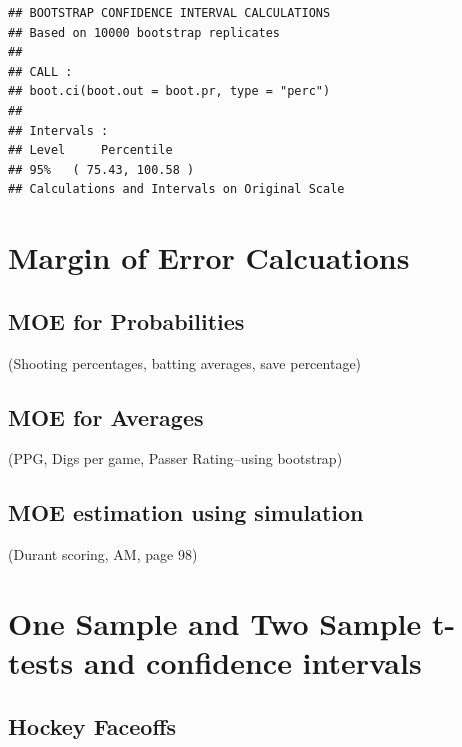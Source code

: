 \documentclass[
  11pt,
]{book}
\theoremstyle{definition}
\theoremstyle{definition}
\theoremstyle{definition}
\theoremstyle{definition}
\theoremstyle{remark}
\begin{document}
\begin{verbatim}
## BOOTSTRAP CONFIDENCE INTERVAL CALCULATIONS
## Based on 10000 bootstrap replicates
## 
## CALL : 
## boot.ci(boot.out = boot.pr, type = "perc")
## 
## Intervals : 
## Level     Percentile     
## 95%   ( 75.43, 100.58 )  
## Calculations and Intervals on Original Scale
\end{verbatim}

\newpage

\hypertarget{margin-of-error-calcuations}{%
\section{Margin of Error Calcuations}\label{margin-of-error-calcuations}}

\hypertarget{moe-for-probabilities}{%
\subsection{MOE for Probabilities}\label{moe-for-probabilities}}

(Shooting percentages, batting averages, save percentage)

\hypertarget{moe-for-averages}{%
\subsection{MOE for Averages}\label{moe-for-averages}}

(PPG, Digs per game, Passer Rating--using bootstrap)

\hypertarget{moe-estimation-using-simulation}{%
\subsection{MOE estimation using simulation}\label{moe-estimation-using-simulation}}

(Durant scoring, AM, page 98)

\hypertarget{one-sample-and-two-sample-t-tests-and-confidence-intervals}{%
\section{One Sample and Two Sample t-tests and confidence intervals}\label{one-sample-and-two-sample-t-tests-and-confidence-intervals}}

\hypertarget{hockey-faceoffs}{%
\subsection{Hockey Faceoffs}\label{hockey-faceoffs}}
\end{document}
